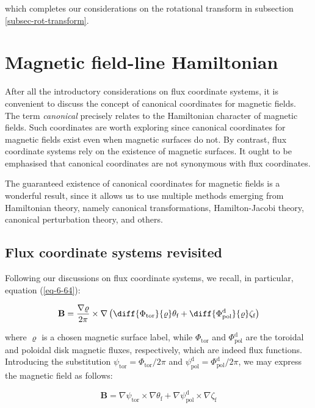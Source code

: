 which completes our considerations on the rotational transform in subsection \ref{subsec-rot-transform}.

\section{Magnetic field-line Hamiltonian}

After all the introductory considerations on flux coordinate systems, it is convenient to discuss the concept of canonical coordinates for magnetic fields. The term \textit{canonical} precisely relates to the Hamiltonian character of magnetic fields. Such coordinates are worth exploring since canonical coordinates for magnetic fields exist even when magnetic surfaces do not. By contrast, flux coordinate systems rely on the existence of magnetic surfaces. It ought to be emphasised that canonical coordinates are not synonymous with flux coordinates.

\quad The guaranteed existence of canonical coordinates for magnetic fields is a wonderful result, since it allows us to use multiple methods emerging from Hamiltonian theory, namely canonical transformations, Hamilton-Jacobi theory, canonical perturbation theory, and others.

\subsection{Flux coordinate systems revisited}

Following our discussions on flux coordinate systems, we recall, in particular, equation (\ref{eq-6-64}):

\begin{equation}
    \mathbf{B}=\frac{\nabla\varrho}{2\pi}\times\nabla\left(\diff{\Phi_\text{tor}}{\varrho}\theta_\text{f}+\diff{\Phi_\text{pol}^\mathrm{d}}{\varrho}\zeta_\text{f}\right)
\end{equation}

where $\varrho$ is a chosen magnetic surface label, while $\Phi_\text{tor}$ and $\Phi_\text{pol}^\mathrm{d}$ are the toroidal and poloidal disk magnetic fluxes, respectively, which are indeed flux functions. Introducing the substitution $\psi_\text{tor}=\Phi_\text{tor}/2\pi$ and $\psi_\text{pol}^\mathrm{d}=\Phi_\text{pol}^\mathrm{d}/2\pi$, we may express the magnetic field as follows:

\begin{equation}
    \mathbf{B}=\nabla\psi_\text{tor}\times\nabla\theta_\text{f}+\nabla\psi_\text{pol}^\mathrm{d}\times\nabla\zeta_\text{f}
\end{equation}

